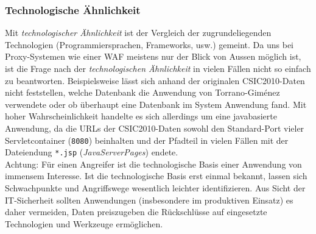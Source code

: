 \subsubsection{Technologische Ähnlichkeit}
Mit \emph{technologischer Ähnlichkeit} ist der Vergleich der zugrundeliegenden Technologien (Programmiersprachen, Frameworks, usw.) gemeint. Da uns bei Proxy-Systemen wie einer WAF meistens nur der Blick von Aussen möglich ist, ist die Frage nach der \emph{technologischen Ähnlichkeit} in vielen Fällen nicht so einfach zu beantworten. Beispielsweise lässt sich anhand der originalen CSIC2010-Daten nicht feststellen, welche Datenbank die Anwendung von Torrano-Giménez verwendete oder ob überhaupt eine Datenbank im System Anwendung fand. Mit hoher Wahrscheinlichkeit handelte es sich allerdings um eine javabasierte Anwendung, da die URLs der CSIC2010-Daten sowohl den Standard-Port vieler Servletcontainer (\verb=8080=) beinhalten und der Pfadteil in vielen Fällen mit der Dateiendung \verb=*.jsp= (\emph{JavaServerPages}) endete.\\

\textcolor{bhtBlue}{ Achtung:} Für einen Angreifer ist die technologische Basis einer Anwendung von immensem Interesse. Ist die technologische Basis erst einmal bekannt, lassen sich Schwachpunkte und Angriffswege wesentlich leichter identifizieren. Aus Sicht der IT-Sicherheit sollten Anwendungen (insbesondere im produktiven Einsatz) es daher vermeiden, Daten preiszugeben die Rückschlüsse auf eingesetzte Technologien und Werkzeuge ermöglichen.\\

